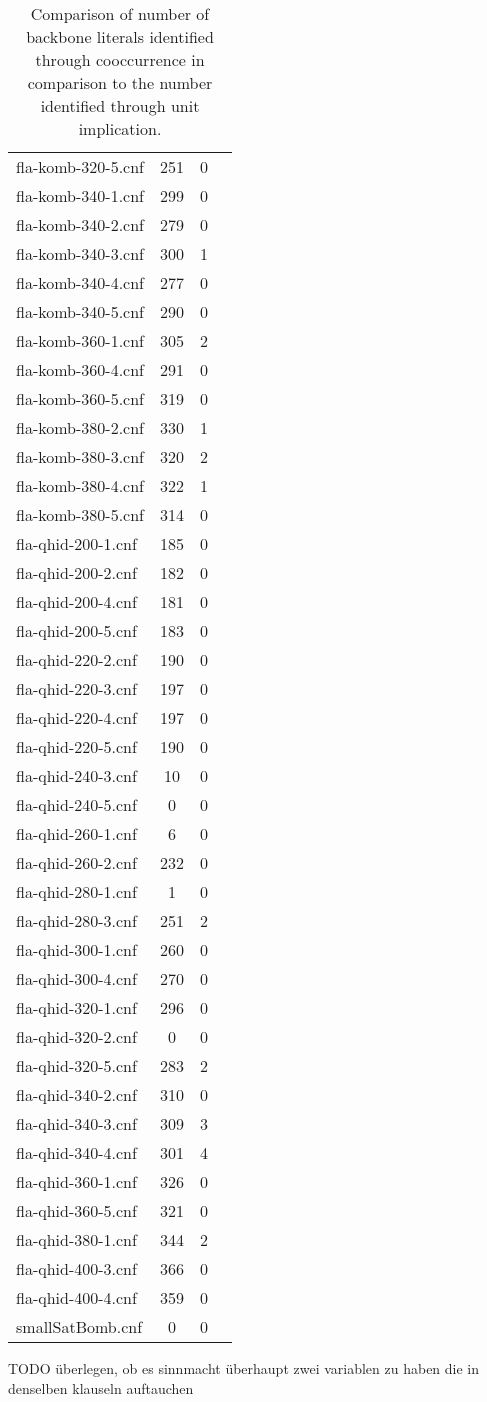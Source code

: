 \begin{wraptable}{L}{6cm}
\begin{tabular}{l| c c c }
fla-komb-320-5.cnf & 251 & 0 \\
fla-komb-340-1.cnf & 299 & 0 \\
fla-komb-340-2.cnf & 279 & 0 \\
fla-komb-340-3.cnf & 300 & 1 \\
fla-komb-340-4.cnf & 277 & 0 \\
fla-komb-340-5.cnf & 290 & 0 \\
fla-komb-360-1.cnf & 305 & 2 \\
fla-komb-360-4.cnf & 291 & 0 \\
fla-komb-360-5.cnf & 319 & 0 \\
fla-komb-380-2.cnf & 330 & 1 \\
fla-komb-380-3.cnf & 320 & 2 \\
fla-komb-380-4.cnf & 322 & 1 \\
fla-komb-380-5.cnf & 314 & 0 \\
fla-qhid-200-1.cnf & 185 & 0 \\
fla-qhid-200-2.cnf & 182 & 0 \\
fla-qhid-200-4.cnf & 181 & 0 \\
fla-qhid-200-5.cnf & 183 & 0 \\
fla-qhid-220-2.cnf & 190 & 0 \\
fla-qhid-220-3.cnf & 197 & 0 \\
fla-qhid-220-4.cnf & 197 & 0 \\
fla-qhid-220-5.cnf & 190 & 0 \\
fla-qhid-240-3.cnf & 10 & 0 \\
fla-qhid-240-5.cnf & 0 & 0 \\
fla-qhid-260-1.cnf & 6 & 0 \\
fla-qhid-260-2.cnf & 232 & 0 \\
fla-qhid-280-1.cnf & 1 & 0 \\
fla-qhid-280-3.cnf & 251 & 2 \\
fla-qhid-300-1.cnf & 260 & 0 \\
fla-qhid-300-4.cnf & 270 & 0 \\
fla-qhid-320-1.cnf & 296 & 0 \\
\fi
fla-qhid-320-2.cnf & 0 & 0 \\
fla-qhid-320-5.cnf & 283 & 2 \\
fla-qhid-340-2.cnf & 310 & 0 \\
fla-qhid-340-3.cnf & 309 & 3 \\
fla-qhid-340-4.cnf & 301 & 4 \\
fla-qhid-360-1.cnf & 326 & 0 \\
fla-qhid-360-5.cnf & 321 & 0 \\
fla-qhid-380-1.cnf & 344 & 2 \\
fla-qhid-400-3.cnf & 366 & 0 \\
fla-qhid-400-4.cnf & 359 & 0 \\
smallSatBomb.cnf & 0 & 0\\
\end{tabular}
\caption{Comparison of number of backbone literals identified through cooccurrence in comparison to the number identified through unit implication.}
\end{wraptable}


TODO überlegen, ob es sinnmacht überhaupt zwei variablen zu haben die in denselben klauseln auftauchen
